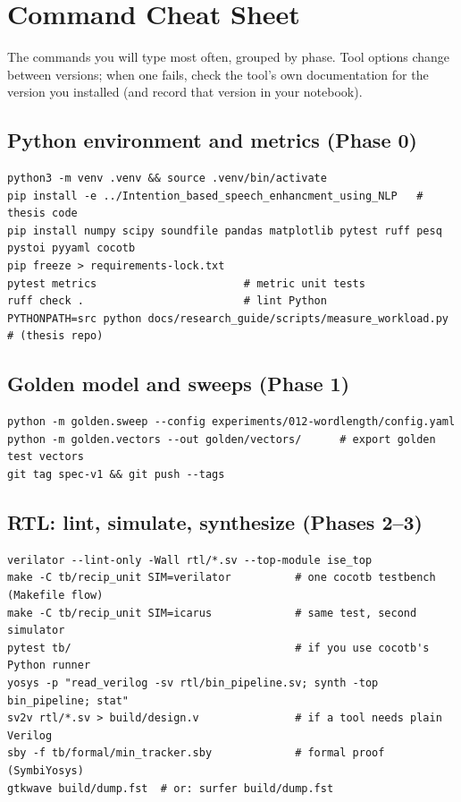 \chapter{Command Cheat Sheet}\label{app:cheatsheet}

The commands you will type most often, grouped by phase. Tool options change
between versions; when one fails, check the tool's own documentation for the
version you installed (and record that version in your notebook).

\section*{Python environment and metrics (Phase 0)}
\begin{lstlisting}[style=shell]
python3 -m venv .venv && source .venv/bin/activate
pip install -e ../Intention_based_speech_enhancment_using_NLP   # thesis code
pip install numpy scipy soundfile pandas matplotlib pytest ruff pesq pystoi pyyaml cocotb
pip freeze > requirements-lock.txt
pytest metrics                       # metric unit tests
ruff check .                         # lint Python
PYTHONPATH=src python docs/research_guide/scripts/measure_workload.py   # (thesis repo)
\end{lstlisting}

\section*{Golden model and sweeps (Phase 1)}
\begin{lstlisting}[style=shell]
python -m golden.sweep --config experiments/012-wordlength/config.yaml
python -m golden.vectors --out golden/vectors/      # export golden test vectors
git tag spec-v1 && git push --tags
\end{lstlisting}

\section*{RTL: lint, simulate, synthesize (Phases 2--3)}
\begin{lstlisting}[style=shell]
verilator --lint-only -Wall rtl/*.sv --top-module ise_top
make -C tb/recip_unit SIM=verilator          # one cocotb testbench (Makefile flow)
make -C tb/recip_unit SIM=icarus             # same test, second simulator
pytest tb/                                   # if you use cocotb's Python runner
yosys -p "read_verilog -sv rtl/bin_pipeline.sv; synth -top bin_pipeline; stat"
sv2v rtl/*.sv > build/design.v               # if a tool needs plain Verilog
sby -f tb/formal/min_tracker.sby             # formal proof (SymbiYosys)
gtkwave build/dump.fst  # or: surfer build/dump.fst
\end{lstlisting}

